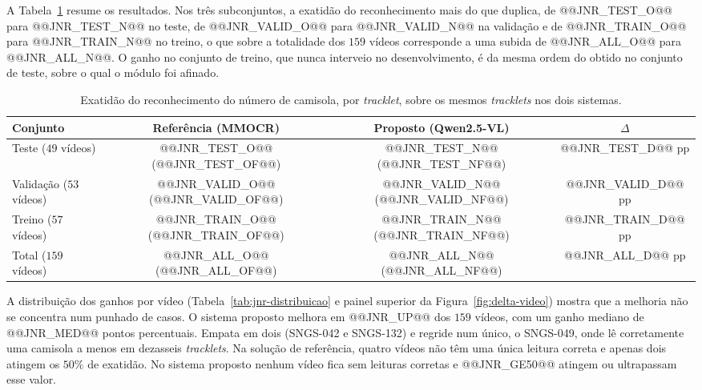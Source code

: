 A Tabela~\ref{tab:jnr} resume os resultados. Nos três subconjuntos, a exatidão do reconhecimento mais
do que duplica, de @@JNR_TEST_O@@ para @@JNR_TEST_N@@ no teste, de @@JNR_VALID_O@@ para
@@JNR_VALID_N@@ na validação e de @@JNR_TRAIN_O@@ para @@JNR_TRAIN_N@@ no treino, o que sobre a
totalidade dos $159$ vídeos corresponde a uma subida de @@JNR_ALL_O@@ para @@JNR_ALL_N@@. O ganho no
conjunto de treino, que nunca interveio no desenvolvimento, é da mesma ordem do obtido no conjunto de
teste, sobre o qual o módulo foi afinado.

\begin{table}[htbp]
    \centering
    \caption{Exatidão do reconhecimento do número de camisola, por \emph{tracklet}, sobre os mesmos
    \emph{tracklets} nos dois sistemas.}
    \label{tab:jnr}
    \begin{tabular}{|l|c|c|c|}
        \hline
        \textbf{Conjunto} & \textbf{Referência (MMOCR)} & \textbf{Proposto (Qwen2.5-VL)} & \textbf{$\Delta$} \\
        \hline
        Teste ($49$ vídeos)     & @@JNR_TEST_O@@ (@@JNR_TEST_OF@@)   & @@JNR_TEST_N@@ (@@JNR_TEST_NF@@)   & @@JNR_TEST_D@@ pp \\
        \hline
        Validação ($53$ vídeos) & @@JNR_VALID_O@@ (@@JNR_VALID_OF@@) & @@JNR_VALID_N@@ (@@JNR_VALID_NF@@) & @@JNR_VALID_D@@ pp \\
        \hline
        Treino ($57$ vídeos)    & @@JNR_TRAIN_O@@ (@@JNR_TRAIN_OF@@) & @@JNR_TRAIN_N@@ (@@JNR_TRAIN_NF@@) & @@JNR_TRAIN_D@@ pp \\
        \hline
        Total ($159$ vídeos)    & @@JNR_ALL_O@@ (@@JNR_ALL_OF@@)     & @@JNR_ALL_N@@ (@@JNR_ALL_NF@@)     & @@JNR_ALL_D@@ pp \\
        \hline
    \end{tabular}
\end{table}

A distribuição dos ganhos por vídeo (Tabela~\ref{tab:jnr-distribuicao} e painel superior da
Figura~\ref{fig:delta-video}) mostra que a melhoria não se concentra num punhado de casos. O
sistema proposto melhora em @@JNR_UP@@ dos $159$ vídeos, com um ganho mediano de @@JNR_MED@@ pontos
percentuais. Empata em dois (SNGS-042 e SNGS-132) e regride num único, o SNGS-049, onde lê
corretamente uma camisola a menos em dezasseis \emph{tracklets}. Na solução de referência, quatro
vídeos não têm uma única leitura correta e apenas dois atingem os $50\%$ de exatidão. No sistema
proposto nenhum vídeo fica sem leituras corretas e @@JNR_GE50@@ atingem ou ultrapassam esse valor.

